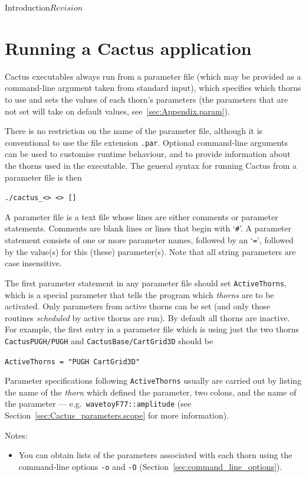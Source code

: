 \begin{cactuspart}{Introduction}{}{$Revision$}
\section{Running a Cactus application}

Cactus executables always run from a parameter file (which may be
provided as a command-line argument taken from standard input), which
specifies which thorns to use and sets the values of each thorn's 
parameters (the parameters that are not set will take on default values, 
see~\ref{sec:Appendix.param}).

There is no restriction on the name
of the parameter file, although it is conventional to use the file
extension \texttt{.par}.  Optional command-line arguments can be used
to customise runtime behaviour, and to provide information about the
thorns used in the executable. The general syntax for running Cactus from
a parameter file is then

\texttt{./cactus\_<> <>
[]}

A parameter file is a text file whose lines are either comments
or parameter statements.
Comments are blank lines or lines that begin with `\texttt{\#}'.
A parameter statement consists of one or more parameter names, followed by
an `\texttt{=}', followed by the value(s) for this (these) parameter(s).
Note that all string parameters are case insensitive.

The first parameter statement in any parameter file should set \texttt{ActiveThorns},
which is a special parameter that tells the
program which \textit{thorns} are to be activated.  Only parameters from active
thorns can be set (and only those routines \textit{scheduled} by active thorns
are run).  By default all thorns are inactive. For example, the first
entry in a parameter file which is using just the two thorns
\texttt{CactusPUGH/PUGH} and \texttt{CactusBase/CartGrid3D} should be

\texttt{ActiveThorns = "PUGH CartGrid3D"}

Parameter specifications following \texttt{ActiveThorns} usually are
carried out by listing
the name of the \textit{thorn} which defined the parameter, two colons,
and the name of the parameter --- e.g.~\texttt{wavetoyF77::amplitude}
(see Section~\ref{sec:Cactus_parameters.scope} for more information).

Notes:

\begin{itemize}

\item{} You can obtain lists of the parameters associated with
each thorn using the command-line options \texttt{-o} and \texttt{-O}
(Section~\ref{sec:command_line_options}).


\end{itemize}
\end{cactuspart}
